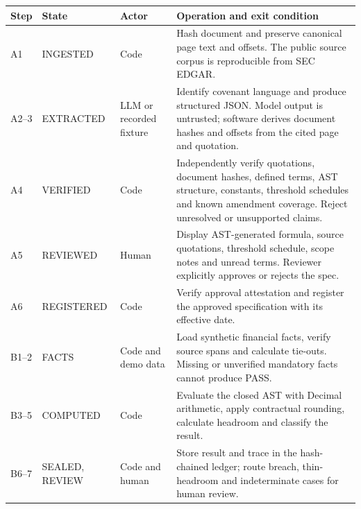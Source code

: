 \documentclass[10pt,letterpaper]{article}
\newcommand{\tabsize}{\footnotesize}
\begin{document}
\smallskip
\begin{tabularx}{\linewidth}{@{}l L{2.9cm} L{2.4cm} Y@{}}
\toprule
\tabsize\textbf{Step} & \tabsize\textbf{State} & \tabsize\textbf{Actor} & \tabsize\textbf{Operation and exit condition} \\
\midrule
\tabsize A1 & \tabsize INGESTED & \tabsize Code & \tabsize Hash document and preserve canonical page text and offsets. The public source corpus is reproducible from SEC EDGAR. \\
\tabsize A2--3 & \tabsize EXTRACTED & \tabsize LLM or recorded fixture & \tabsize Identify covenant language and produce structured JSON. Model output is untrusted; software derives document hashes and offsets from the cited page and quotation. \\
\tabsize A4 & \tabsize VERIFIED & \tabsize Code & \tabsize Independently verify quotations, document hashes, defined terms, AST structure, constants, threshold schedules and known amendment coverage. Reject unresolved or unsupported claims. \\
\tabsize A5 & \tabsize REVIEWED & \tabsize Human & \tabsize Display AST-generated formula, source quotations, threshold schedule, scope notes and unread terms. Reviewer explicitly approves or rejects the spec. \\
\tabsize A6 & \tabsize REGISTERED & \tabsize Code & \tabsize Verify approval attestation and register the approved specification with its effective date. \\
\midrule
\tabsize B1--2 & \tabsize FACTS & \tabsize Code and demo data & \tabsize Load synthetic financial facts, verify source spans and calculate tie-outs. Missing or unverified mandatory facts cannot produce PASS. \\
\tabsize B3--5 & \tabsize COMPUTED & \tabsize Code & \tabsize Evaluate the closed AST with Decimal arithmetic, apply contractual rounding, calculate headroom and classify the result. \\
\tabsize B6--7 & \tabsize SEALED, REVIEW & \tabsize Code and human & \tabsize Store result and trace in the hash-chained ledger; route breach, thin-headroom and indeterminate cases for human review. \\
\bottomrule
\end{tabularx}
\end{document}
